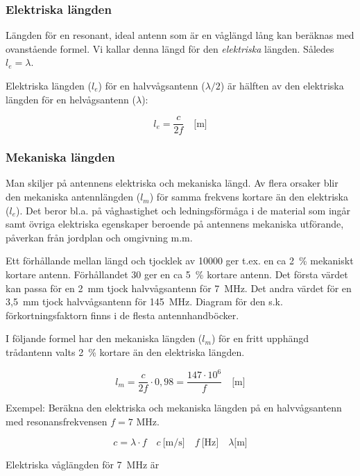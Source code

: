 \subsubsection{Elektriska längden}

Längden för en resonant, ideal antenn som är en våglängd lång kan
beräknas med ovanstående formel. Vi kallar denna längd för den
\emph{elektriska} längden. Således \(l_e = \lambda\).

Elektriska längden (\(l_e\)) för en halvvågsantenn (\(\lambda/2\))
är hälften av den elektriska längden för en helvågsantenn
(\(\lambda\)):

\[l_e = \frac{c}{2f} \quad \text{[m]}\]

\subsubsection{Mekaniska längden}

Man skiljer på antennens elektriska och mekaniska längd. Av flera
orsaker blir den mekaniska antennlängden (\(l_m\)) för samma
frekvens kortare än den elektriska (\(l_e\)). Det beror bl.a. på
våghastighet och ledningsförmåga i de material som ingår samt övriga
elektriska egenskaper beroende på antennens mekaniska utförande,
påverkan från jordplan och omgivning m.m.

Ett förhållande mellan längd och tjocklek av 10000 ger t.ex. en ca 2~\%
mekaniskt kortare antenn.
Förhållandet 30 ger en ca 5~\% kortare antenn.
Det första värdet kan passa för en 2~mm tjock halvvågsantenn för 7~MHz.
Det andra värdet för en 3,5~mm tjock halvvågsantenn för 145~MHz.
Diagram för den s.k. förkortningsfaktorn finns i de flesta antennhandböcker.

I följande formel har den mekaniska längden (\(l_m\)) för en fritt upphängd
trådantenn valts 2~\% kortare än den elektriska längden.

\[l_m = \frac{c}{2f} \cdot 0,98 = \frac{147\cdot 10^6}{f} \quad \text{[m]}\]

Exempel: Beräkna den elektriska och mekaniska längden på en halvvågsantenn med
resonansfrekvensen \(f = 7\) MHz.

\[
c = \lambda \cdot f
\quad c\ \text{[m/s]} \quad f\ \text{[Hz]} \quad \lambda \text{[m]}
\]

Elektriska våglängden för 7~MHz är

